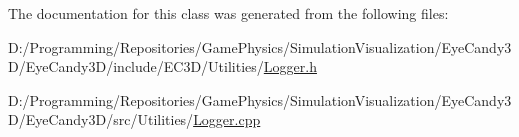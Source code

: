 The documentation for this class was generated from the following files\+:\begin{DoxyCompactItemize}
\item 
D\+:/\+Programming/\+Repositories/\+Game\+Physics/\+Simulation\+Visualization/\+Eye\+Candy3\+D/\+Eye\+Candy3\+D/include/\+E\+C3\+D/\+Utilities/\mbox{\hyperlink{_logger_8h}{Logger.\+h}}\item 
D\+:/\+Programming/\+Repositories/\+Game\+Physics/\+Simulation\+Visualization/\+Eye\+Candy3\+D/\+Eye\+Candy3\+D/src/\+Utilities/\mbox{\hyperlink{_logger_8cpp}{Logger.\+cpp}}\end{DoxyCompactItemize}
